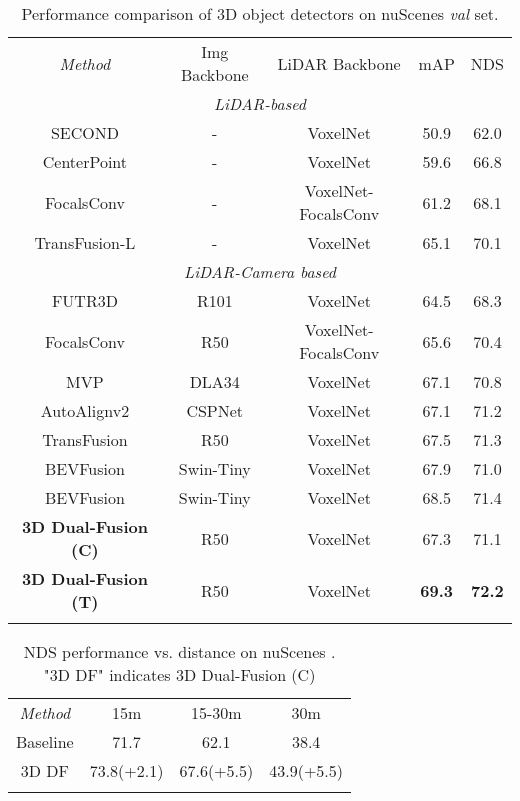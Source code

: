\documentclass[lettersize,journal]{IEEEtran}
\begin{document}
\begin{table*}[htb]

\renewcommand{\arraystretch}{1.0}
\centering
\caption{Performance comparison of 3D object detectors on nuScenes \textit{val} set. }
\begin{tabular}{ccccc}
\cline{1-5}
\textit{Method} &Img Backbone & LiDAR Backbone  & mAP  & NDS \\
\cline{1-5}                                                         
\multicolumn{5}{c}{\textit{LiDAR-based}}  \\
\cline{1-5}                 
SECOND\cite{second}   & - & VoxelNet  & 50.9  & 62.0  \\
CenterPoint\cite{centerpoint}   & - & VoxelNet  & 59.6  & 66.8  \\
FocalsConv \cite{focalsconv} & - & VoxelNet-FocalsConv & 61.2 & 68.1 \\
TransFusion-L\cite{transfusion}   & - & VoxelNet  & 65.1  & 70.1 
\\

\cline{1-5}               
\multicolumn{5}{c}{\textit{LiDAR-Camera based}}  \\
\cline{1-5}            
FUTR3D\cite{futr3d}   & R101 & VoxelNet  & 64.5  & 68.3  \\
FocalsConv \cite{focalsconv} & R50 & VoxelNet-FocalsConv & 65.6 & 70.4 \\
MVP\cite{mvp}   & DLA34 & VoxelNet  & 67.1  & 70.8  \\
AutoAlignv2\cite{autoalignv2}   & CSPNet & VoxelNet  & 67.1  & 71.2  \\
TransFusion\cite{transfusion}   & R50 & VoxelNet  & 67.5  & 71.3  \\
BEVFusion\cite{bevfusion}   & Swin-Tiny & VoxelNet  & 67.9  & 71.0  \\
BEVFusion\cite{bevfusion2}   & Swin-Tiny & VoxelNet  & 68.5  & 71.4  \\
\cline{1-5}
\textbf{3D Dual-Fusion (C)}      & R50 & VoxelNet  & 67.3  & 71.1  \\
\textbf{3D Dual-Fusion (T)}      & R50 & VoxelNet  & \textbf{69.3}  & \textbf{72.2}  \\
\cline{1-5}
\label{table:nus_val}
\end{tabular}
\end{table*}
 
\begin{table}[t]
\centering
\caption{NDS performance vs. distance on nuScenes . "3D DF" indicates 3D Dual-Fusion (C)}
\begin{tabular}{cccc}
\cline{1-4}
\cline{2-4}
\textit{Method} & 15m  & 15-30m      & 30m  \\\cline{1-4}
Baseline\cite{centerpoint}& 71.7 & 62.1 & 38.4 \\3D DF& 73.8(+2.1) & 67.6(+5.5) & 43.9(+5.5)\\

\cline{1-4}
\label{table:abl_nus_dist}

\end{tabular}
\end{table}
\end{document}
